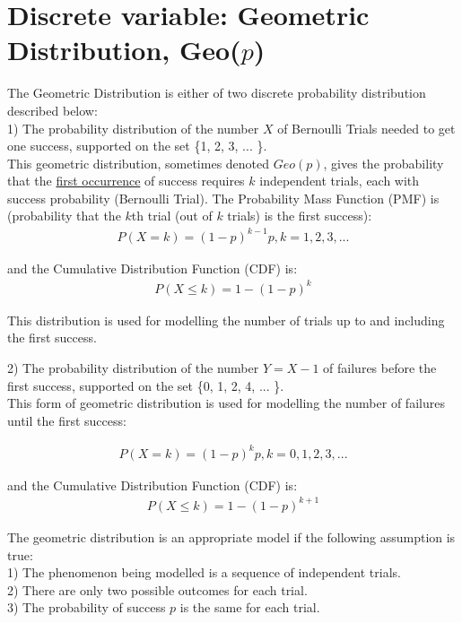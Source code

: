 \section{Discrete variable: Geometric Distribution, Geo($p$)}

The Geometric Distribution is either of two discrete probability distribution described below: \\

1) The probability distribution of the number $X$ of Bernoulli Trials needed to get one success, supported on the set \{1, 2, 3, ... \}. \\

This geometric distribution, sometimes denoted $Geo(p)$, gives the probability that the \underline{first occurrence} of success requires $k$ independent trials, each with success probability (Bernoulli Trial). The Probability Mass Function (PMF) is (probability that the $k$th trial (out of $k$ trials) is the first success):\\
\begin{eqnarray}
P(X=k) = (1 - p)^{k-1} p, k=1,2,3,...
\label{geo_pmf_1}
\end{eqnarray}

and the Cumulative Distribution Function (CDF) is:\\
\begin{eqnarray}
P(X \le k) = 1 - (1-p)^k
\label{geo_cdf_1}
\end{eqnarray}

This distribution is used for modelling the number of trials up to and including the first success.

2) The probability distribution of the number $Y = X - 1$ of failures before the first success, supported on the set \{0, 1, 2, 4, ... \}. \\

This form of geometric distribution is used for modelling the number of failures until the first success:

\begin{eqnarray}
P(X=k) = (1 - p)^k p, k=0,1,2,3,...
\label{geo_pmf_2}
\end{eqnarray}

and the Cumulative Distribution Function (CDF) is:\\
\begin{eqnarray}
P(X \le k) = 1 - (1-p)^{k+1}
\label{geo_cdf_2}
\end{eqnarray}

The geometric distribution is an appropriate model if the following assumption is true:\\
1) The phenomenon being  modelled is a sequence of independent trials.\\
2) There are only two possible outcomes for each trial. \\
3) The probability of success $p$ is the same for each trial.\\

